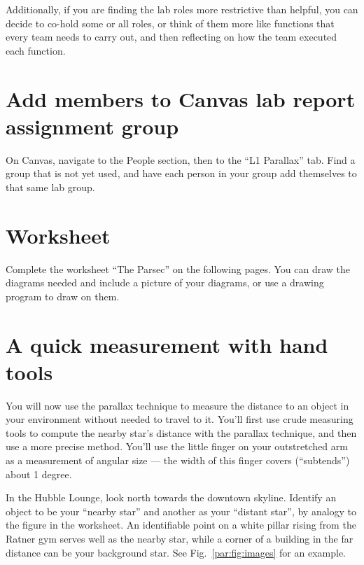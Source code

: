 Additionally, if you are finding the lab roles more restrictive than helpful, you can decide to co-hold some or all roles, or think of them more like functions that every team needs to carry out, and then reflecting on how the team executed each function.

\section{Add members to Canvas lab report assignment group}

\begin{steps}
	\item On Canvas, navigate to the People section, then to the ``L1 Parallax'' tab. Find a group that is not yet used, and have each person in your group add themselves to that same lab group.
\end{steps}

\section{Worksheet}

Complete the worksheet ``The Parsec'' on the following pages. You can draw the diagrams needed and include a picture of your diagrams, or use a drawing program to draw on them.



\section{A quick measurement with hand tools}

You will now use the parallax technique to measure the distance to an object in your environment without needed to travel to it. You'll first use crude measuring tools to compute the nearby star's distance with the parallax technique, and then use a more precise method. You'll use the little finger on your outstretched arm as a measurement of angular size --- the width of this finger covers (``subtends'') about 1 degree.

\begin{steps}
	\item In the Hubble Lounge, look north towards the downtown skyline. Identify an object to be your ``nearby star'' and another as your ``distant star'', by analogy to the figure in the worksheet. An identifiable point on a white pillar rising from the Ratner gym serves well as the nearby star, while a corner of a building in the far distance can be your background star. See Fig.~\ref{par:fig:images} for an example.
\end{steps}
	
